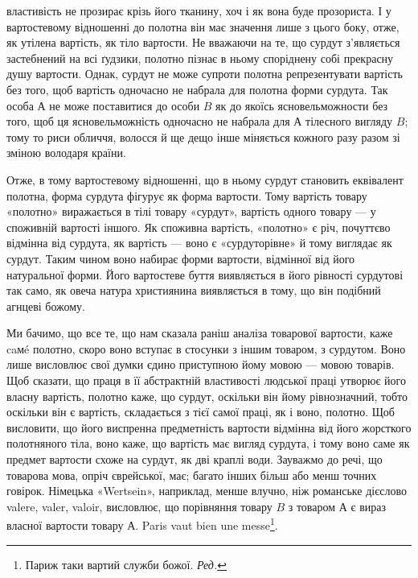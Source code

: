 \parcont{}  %
властивість не прозирає крізь його тканину, хоч і як вона буде
прозориста. І у вартостевому відношенні до полотна він має значення
лише з цього боку, отже, як утілена вартість, як тіло вартости.
Не вважаючи на те, що сурдут з’являється застебнений на
всі ґудзики, полотно пізнає в ньому споріднену собі прекрасну
душу вартости. Однак, сурдут не може супроти полотна репрезентувати
вартість без того, щоб вартість одночасно не набрала
для полотна форми сурдута. Так особа $А$ не може поставитися до
особи $B$ як до якоїсь ясновельможности без того, щоб ця ясновельможність
одночасно не набрала для $А$ тілесного вигляду $B$;
тому то риси обличчя, волосся й ще дещо інше міняється кожного
разу разом зі зміною володаря країни.

Отже, в тому вартостевому відношенні, що в ньому сурдут
становить еквівалент полотна, форма сурдута фігурує як форма
вартости. Тому вартість товару «полотно» виражається в тілі
товару «сурдут», вартість одного товару — у споживній вартості
іншого. Як споживна вартість, «полотно» є річ, почуттєво відмінна
від сурдута, як вартість — воно є «сурдуторівне» й тому
виглядає як сурдут. Таким чином воно набирає форми вартости,
відмінної від його натуральної форми. Його вартостеве буття
виявляється в його рівності сурдутові так само, як овеча натура
християнина виявляється в тому, що він подібний агнцеві божому.

Ми бачимо, що все те, що нам сказала раніш аналіза товарової
вартости, каже caмé полотно, скоро воно вступає в стосунки з
іншим товаром, з сурдутом. Воно лише висловлює свої думки єдино
приступною йому мовою — мовою товарів. Щоб сказати, що
праця в її абстрактній властивості людської праці утворює його
власну вартість, полотно каже, що сурдут, оскільки він йому
рівнозначний, тобто оскільки він є вартість, складається з тієї
самої праці, як і воно, полотно. Щоб висловити, що його виспренна
предметність вартости відмінна від його жорсткого полотняного
тіла, воно каже, що вартість має вигляд сурдута, і тому
воно саме як предмет вартости схоже на сурдут, як дві краплі
води. Зауважмо до речі, що товарова мова, опріч єврейської, має;
багато інших більш або менш точних говірок. Німецька «Wertsein»,
наприклад, менше влучно, ніж романське дієслово valere,
valer, valoir, висловлює, що порівняння товару $B$ з товаром $А$ є
вираз власної вартости товару $А$. Paris vaut bien une messe\footnote*{
Париж таки вартий служби божої. \emph{Ред.}
}.

